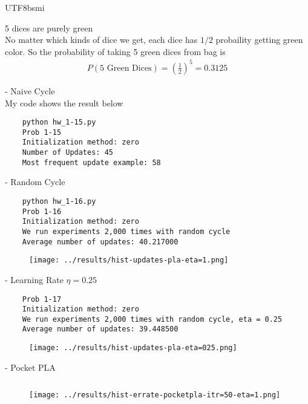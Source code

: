 \documentclass[12pt]{article}
\newenvironment{prob}[2][Prob.]{\begin{trivlist}
\item[\hskip \labelsep {\bfseries #1}\hskip \labelsep {\bfseries #2}]}{\end{trivlist}}
\begin{document}
\begin{CJK}{UTF8}{bsmi}
\begin{prob}{14} 5 dices are purely green \\
	No matter which kinds of dice we get, each dice has $1/2$ probaility getting green color. 
	So the probability of taking 5 green dices from bag is 
	\begin{align*}
		P(\text{5 Green Dices}) = (\frac{1}{2})^5 = 0.3125
	\end{align*}
\end{prob}

\begin{prob}{15}  - Naive Cycle \\
My code shows the result below
\begin{lstlisting}
	python hw_1-15.py
	Prob 1-15
	Initialization method: zero
	Number of Updates: 45
	Most frequent update example: 58
\end{lstlisting}
\end{prob}

\begin{prob}{16} - Random Cycle \\
\begin{lstlisting}
	python hw_1-16.py
	Prob 1-16
	Initialization method: zero
	We run experiments 2,000 times with random cycle
	Average number of updates: 40.217000
\end{lstlisting}
\begin{figure}[H]
	\centering
	\texttt{[image: ../results/hist-updates-pla-eta=1.png]}
	\caption{}
	\label{fig-1-16}
\end{figure}
\end{prob}

\begin{prob}{17} - Learning Rate $\eta = 0.25$ \\
\begin{lstlisting}
	Prob 1-17
	Initialization method: zero
	We run experiments 2,000 times with random cycle, eta = 0.25
	Average number of updates: 39.448500
\end{lstlisting}
\begin{figure}[H]
	\centering
	\texttt{[image: ../results/hist-updates-pla-eta=025.png]}
	\caption{}
	\label{fig-1-17}
\end{figure}
\end{prob}

\begin{prob}{18} - Pocket PLA\\
\begin{lstlisting}
\end{lstlisting}
\begin{figure}[H]
	\centering
	\texttt{[image: ../results/hist-errate-pocketpla-itr=50-eta=1.png]}
	\caption{}
	\label{fig-1-18}
\end{figure}
\end{prob}


\end{CJK}
\end{document}
